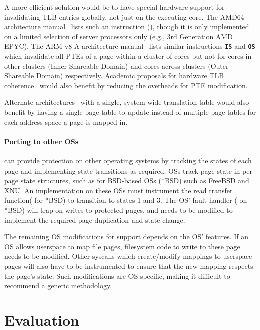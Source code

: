 A more efficient solution would be to have special hardware support
for invalidating TLB entries globally, not just on the executing
core.
The AMD64 architecture manual~\cite{amd64prog} lists such an instruction
(), though it is only implemented on a limited selection
of server processors only (e.g., 3rd Generation AMD EPYC).
The ARM v8-A architecture manual~\cite{armv8a} lists similar instructions
\texttt{\textbf{IS}} and \texttt{\textbf{OS}} which invalidate all PTEs
of a page within a cluster of cores but not for cores in other clusters
(Inner Shareable Domain) and cores across clusters (Outer
Shareable Domain) respectively.
Academic proposals for hardware TLB 
coherence~\cite{VillaviejaKVERMNCU11, YanVCB17, RomanescuLSB10} would also
benefit \midas by reducing the overheads for PTE modification.

Alternate architectures~\cite{0003BOBFP21midgard,ChaseLFL94SASOS} with a single,
system-wide translation table
would also benefit \midas by having a single page table to
update instead of multiple page tables for each address space a page
is mapped in.

\paragraph{Porting to other OSs}
\midas can provide \tocttou protection on other operating systems by
tracking the states of each page and implementing state transitions
as required.
OSs track page state in per-page state structures,
such as  for BSD-based OSs (*BSD) such as FreeBSD and XNU.
An implementation on these OSs must instrument the
read transfer function( for *BSD) to transition to states 1 and 3.
The OS' fault handler ( on *BSD) will trap on writes to
protected pages, and needs to be modified to implement the required page
duplication and state change.

The remaining OS modifications for \midas support depends on
the OS' features.
If an OS allows userspace to map file pages, filesystem code to write
to these page needs to be modified.
Other syscalls which create/modify mappings to userspace pages will
also have to be instrumented to ensure that the new mapping respects the
page's state.
Such modifications are OS-specific, making it difficult to recommend
a generic methodology.


\section{Evaluation}

